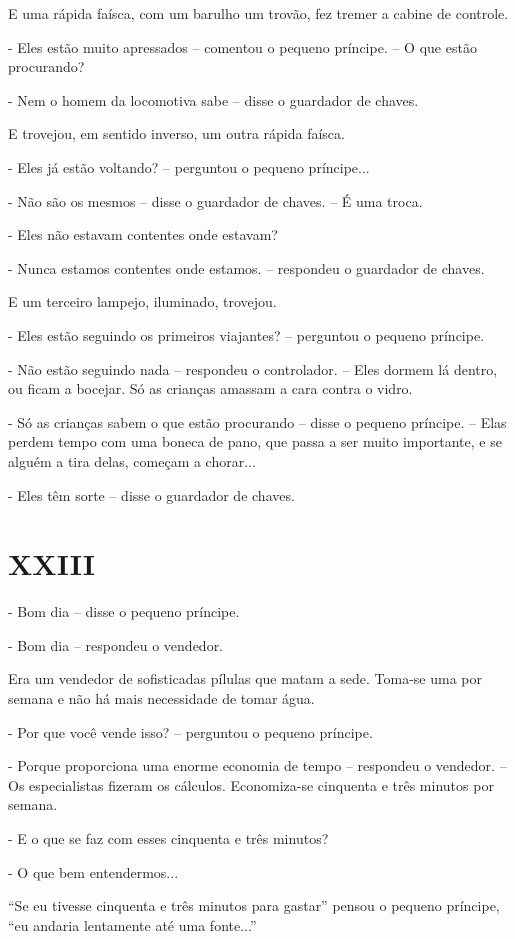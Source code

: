 E uma rápida faísca, com um barulho um trovão, fez tremer a cabine de
controle.

- Eles estão muito apressados -- comentou o pequeno príncipe. -- O que
estão procurando?

- Nem o homem da locomotiva sabe -- disse o guardador de chaves.

E trovejou, em sentido inverso, um outra rápida faísca.

- Eles já estão voltando? -- perguntou o pequeno príncipe...

- Não são os mesmos -- disse o guardador de chaves. -- É uma troca.

- Eles não estavam contentes onde estavam?

- Nunca estamos contentes onde estamos. -- respondeu o guardador de
chaves.

E um terceiro lampejo, iluminado, trovejou.

- Eles estão seguindo os primeiros viajantes? -- perguntou o pequeno
príncipe.

- Não estão seguindo nada -- respondeu o controlador. -- Eles dormem lá
dentro, ou ficam a bocejar. Só as crianças amassam a cara contra o
vidro.

- Só as crianças sabem o que estão procurando -- disse o pequeno
príncipe. -- Elas perdem tempo com uma boneca de pano, que passa a ser
muito importante, e se alguém a tira delas, começam a chorar...

- Eles têm sorte -- disse o guardador de chaves.

\chapter{XXIII}

- Bom dia -- disse o pequeno príncipe.

- Bom dia -- respondeu o vendedor.

Era um vendedor de sofisticadas pílulas que matam a sede. Toma-se uma
por semana e não há mais necessidade de tomar água.

- Por que você vende isso? -- perguntou o pequeno príncipe.

- Porque proporciona uma enorme economia de tempo -- respondeu o
vendedor. -- Os especialistas fizeram os cálculos. Economiza-se
cinquenta e três minutos por semana.

- E o que se faz com esses cinquenta e três minutos?

- O que bem entendermos...

``Se eu tivesse cinquenta e três minutos para gastar'' pensou o pequeno
príncipe, ``eu andaria lentamente até uma fonte...''

